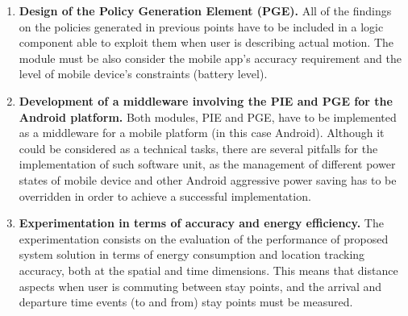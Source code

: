 \documentclass[ENG,PhD]{cinvestav}
\begin{document}
\begin{enumerate}
  \item \textbf{Design of the Policy Generation Element (PGE).}
  All of the findings on the policies generated in previous points have to be included in a logic component able to exploit them when user is describing actual motion.
  The module must be also consider the mobile app's accuracy requirement and the level of mobile device's constraints (battery level).
  

  \item \textbf{Development of a middleware involving the PIE and PGE for the Android platform.}
  Both modules, PIE and PGE, have to be implemented as a middleware for a mobile platform (in this case Android).
  Although it could be considered as a technical tasks, there are several pitfalls for the implementation of such software unit, as the management of different power states of mobile device and other Android aggressive power saving has to be overridden in order to achieve a successful implementation.

  \item \textbf{Experimentation in terms of accuracy and energy efficiency.}
  The experimentation consists on the evaluation of the performance of proposed system solution in terms of energy consumption and location tracking accuracy, both at the spatial and time dimensions.
  This means that distance aspects when user is commuting between stay points, and the arrival and departure time events (to and from) stay points must be measured.
\end{enumerate}
\end{document}
